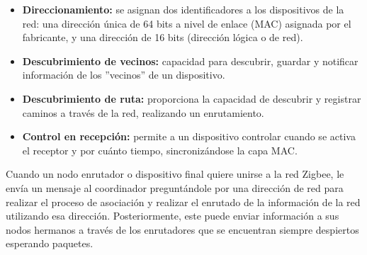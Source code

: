 \begin{itemize}
\begin{itemize}
	\item{\bf Direccionamiento:} se asignan dos identificadores a los dispositivos de la red: una dirección única de 64 bits a nivel de enlace (MAC) asignada por el fabricante, y una dirección de 16 bits (dirección lógica o de red).
	\item{\bf Descubrimiento de vecinos:} capacidad para descubrir, guardar y notificar información de los ''vecinos'' de un dispositivo.
	\item{\bf Descubrimiento de ruta:} proporciona la capacidad de descubrir y registrar caminos a través de la red, realizando un enrutamiento.
	\item{\bf Control en recepción:} permite a un dispositivo controlar cuando se activa el receptor y por cuánto tiempo, sincronizándose la capa MAC.
	\end{itemize}
\end{itemize}
\vspace{0.8cm}
Cuando un nodo enrutador o dispositivo final quiere unirse a la red Zigbee, le envía un mensaje al coordinador preguntándole por una dirección de red para realizar el proceso de asociación y realizar el enrutado de la información de la red utilizando esa dirección. Posteriormente, este puede enviar información a sus nodos hermanos a través de los enrutadores que se encuentran siempre despiertos esperando paquetes.



